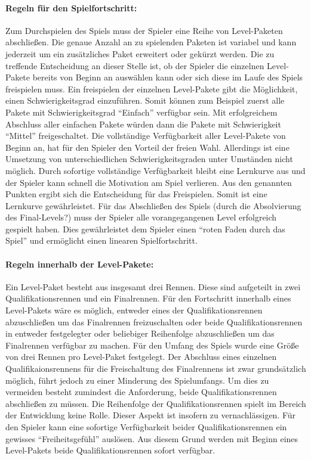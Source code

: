 		\paragraph{Regeln für den Spielfortschritt:}
		Zum Durchspielen des Spiels muss der Spieler eine Reihe von Level-Paketen abschließen. Die genaue Anzahl an zu spielenden Paketen ist variabel und kann jederzeit um ein zusätzliches Paket erweitert oder gekürzt werden. Die zu treffende Entscheidung an dieser Stelle ist, ob der Spieler die einzelnen Level-Pakete bereits von Beginn an auswählen kann oder sich diese im Laufe des Spiels freispielen muss. Ein freispielen der einzelnen Level-Pakete gibt die Möglichkeit, einen Schwierigkeitsgrad einzuführen. Somit können zum Beispiel zuerst alle Pakete mit Schwierigkeitsgrad \enquote{Einfach} verfügbar sein. Mit erfolgreichem Abschluss aller einfachen Pakete würden dann die Pakete mit Schwierigkeit \enquote{Mittel} freigeschaltet.
		Die vollständige Verfügbarkeit aller Level-Pakete von Beginn an, hat für den Spieler den Vorteil der freien Wahl. Allerdings ist eine Umsetzung von unterschiedlichen Schwierigkeitsgraden unter Umständen nicht möglich. Durch sofortige vollständige Verfügbarkeit bleibt eine Lernkurve aus und der Spieler kann schnell die Motivation am Spiel verlieren.
		Aus den genannten Punkten ergibt sich die Entscheidung für das Freispielen. Somit ist eine Lernkurve gewährleistet. Für das Abschließen des Spiels (durch die Absolvierung des Final-Levels?) muss der Spieler alle vorangegangenen Level erfolgreich gespielt haben. Dies gewährleistet dem Spieler einen \enquote{roten Faden durch das Spiel} und ermöglicht einen linearen Spielfortschritt.

		\paragraph{Regeln innerhalb der Level-Pakete:}
		Ein Level-Paket besteht aus insgesamt drei Rennen. Diese sind aufgeteilt in zwei Qualifikationsrennen und ein Finalrennen. Für den Fortschritt innerhalb eines Level-Pakets wäre es möglich, entweder eines der Qualifikationsrennen abzuschließen um das Finalrennen freizuschalten oder beide Qualifikationsrennen in entweder festgelegter oder beliebiger Reihenfolge abzuschließen um das Finalrennen verfügbar zu machen.
		Für den Umfang des Spiels wurde eine Größe von drei Rennen pro Level-Paket festgelegt. Der Abschluss eines einzelnen Qualifikaionsrennens für die Freischaltung des Finalrennens ist zwar grundsätzlich möglich, führt jedoch zu einer Minderung des Spielumfangs. Um dies zu vermeiden besteht zumindest die Anforderung, beide Qualifikationsrennen abschließen zu müssen. Die Reihenfolge der Qualifikationsrennen spielt im Bereich der Entwicklung keine Rolle. Dieser Aspekt ist insofern zu vernachlässigen. Für den Spieler kann eine sofortige Verfügbarkeit beider Qualifikationsrennen ein gewisses \enquote{Freiheitsgefühl} auslösen. Aus diesem Grund werden mit Beginn eines Level-Pakets beide Qualifikationsrennen sofort verfügbar.

